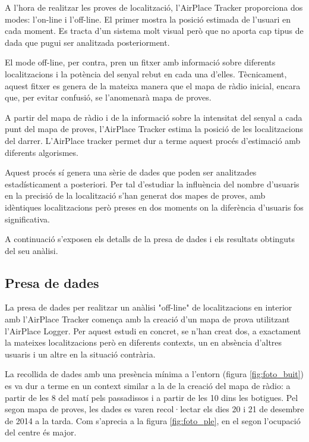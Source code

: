 
A l'hora de realitzar les proves de localització, l'AirPlace Tracker proporciona dos modes: l'on-line i l'off-line. El primer mostra la posició estimada de l'usuari en cada moment. Es tracta d'un sistema molt visual però que no aporta cap tipus de dada que pugui ser analitzada posteriorment.

El mode off-line, per contra, pren un fitxer amb informació sobre diferents localitzacions i la potència del senyal rebut en cada una d'elles. Tècnicament, aquest fitxer es genera de la mateixa manera que el mapa de ràdio inicial, encara que, per evitar confusió, se l'anomenarà mapa de proves.

A partir del mapa de ràdio i de la informació sobre la intensitat del senyal a cada punt del mapa de proves, l'AirPlace Tracker estima la posició de les localitzacions del darrer. L'AirPlace tracker permet dur a terme aquest procés d'estimació amb diferents algorismes.

Aquest procés sí genera una sèrie de dades que poden ser analitzades estadísticament a posteriori. Per tal d'estudiar la influència del nombre d'usuaris en la precisió de la localització s'han generat dos mapes de proves, amb idèntiques localitzacions però preses en dos moments on la diferència d'usuaris fos significativa.

A continuació s'exposen els detalls de la presa de dades i els resultats obtinguts del seu anàlisi.

\subsection{Presa de dades}

La presa de dades per realitzar un anàlisi "off-line" de localitzacions en interior amb l'AirPlace Tracker comença amb la creació d'un mapa de prova utilitzant l'AirPlace Logger. Per aquest estudi en concret, se n'han creat dos, a exactament la mateixes localitzacions però en diferents contexts, un en absència d'altres usuaris i un altre en la situació contrària.

La recollida de dades amb una presència mínima a l'entorn (figura \ref{fig:foto_buit}) es va dur a terme en un context similar a la de la creació del mapa de ràdio: a partir de les 8 del matí pels passadissos i a partir de les 10 dins les botigues. Pel segon mapa de proves, les dades es varen recol·lectar els dies 20 i 21 de desembre de 2014 a la tarda. Com s'aprecia a la figura \ref{fig:foto_ple}, en el segon l'ocupació del centre és major.

